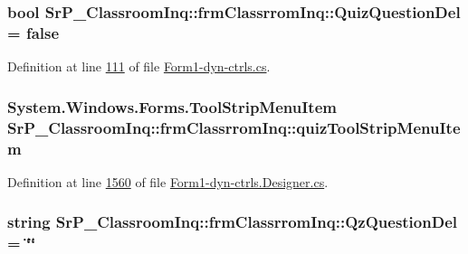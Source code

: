 \hypertarget{class_sr_p___classroom_inq_1_1frm_classrrom_inq_aa1c6ba1dda756081aba5b3cfea87b09d}{
\subsubsection[{\-Quiz\-Question\-Del}]{\setlength{\rightskip}{0pt plus 5cm}bool {\bf \-Sr\-P\-\_\-\-Classroom\-Inq\-::frm\-Classrrom\-Inq\-::\-Quiz\-Question\-Del} = false}}
\label{class_sr_p___classroom_inq_1_1frm_classrrom_inq_aa1c6ba1dda756081aba5b3cfea87b09d}


\-Definition at line \hyperlink{_form1-dyn-ctrls_8cs_source_l00111}{111} of file \hyperlink{_form1-dyn-ctrls_8cs_source}{\-Form1-\/dyn-\/ctrls.\-cs}.

\hypertarget{class_sr_p___classroom_inq_1_1frm_classrrom_inq_a01bd4f13b978688a925fcace4c5f92bc}{
\subsubsection[{quiz\-Tool\-Strip\-Menu\-Item}]{\setlength{\rightskip}{0pt plus 5cm}\-System.\-Windows.\-Forms.\-Tool\-Strip\-Menu\-Item {\bf \-Sr\-P\-\_\-\-Classroom\-Inq\-::frm\-Classrrom\-Inq\-::quiz\-Tool\-Strip\-Menu\-Item}}}
\label{class_sr_p___classroom_inq_1_1frm_classrrom_inq_a01bd4f13b978688a925fcace4c5f92bc}


\-Definition at line \hyperlink{_form1-dyn-ctrls_8_designer_8cs_source_l01560}{1560} of file \hyperlink{_form1-dyn-ctrls_8_designer_8cs_source}{\-Form1-\/dyn-\/ctrls.\-Designer.\-cs}.

\hypertarget{class_sr_p___classroom_inq_1_1frm_classrrom_inq_a1fe88369748706492ccc7292a0e47331}{
\subsubsection[{\-Qz\-Question\-Del}]{\setlength{\rightskip}{0pt plus 5cm}string {\bf \-Sr\-P\-\_\-\-Classroom\-Inq\-::frm\-Classrrom\-Inq\-::\-Qz\-Question\-Del} = \char`\"{}\char`\"{}}}
\label{class_sr_p___classroom_inq_1_1frm_classrrom_inq_a1fe88369748706492ccc7292a0e47331}


